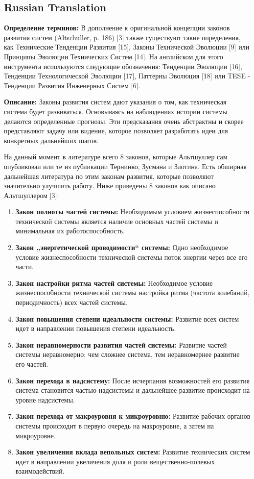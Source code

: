 \documentclass[11pt,a4paper]{article}
\begin{document}
\subsection*{Russian Translation}

\textbf{Определение терминов:} В дополнение к оригинальной концепции законов
развития систем (Altschuller, p. 186) [3] также существуют такие определения,
как Технические Тенденции Развития [15], Законы Технической Эволюции [9] или
Принципы Эволюции Технических Систем [14]. На английском для этого инструмента
используются следующие обозначения: Тенденции Эволюции [16], Тенденции
Технологической Эволюции [17], Паттерны Эволюция [18] или TESE - Тенденции
Развития Инженерных Систем [6].

\textbf{Описание:} Законы развития систем дают указания о том, как техническая
система будет развиваться. Основываясь на наблюдениях истории системы делаются
определенные прогнозы. Эти предсказания очень абстрактны и скорее представляют
задачу или видение, которое позволяет разработать идеи для конкретных
дальнейших шагов.

На данный момент в литературе всего 8 законов, которые Альтшуллер сам
опубликовал или те из публикации Тернинко, Зусмана и Злотина. Есть обширная
дальнейшая литература по этим законам развития, которые позволяют значительно
улучшить работу. Ниже приведены 8 законов как описано Альтшуллером [3]:
\begin{enumerate}
\item \textbf{Закон полноты частей системы:} Необходимым условием
  жизнеспособности технической системы является наличие основных частей
  системы и минимальная их работоспособность.
\item \textbf{Закон „энергетической проводимости“ системы:} Одно необходимое
  условие жизнеспособности технической системы поток энергии через все его
  части.
\item \textbf{Закон настройки ритма частей системы:} Необходимое условие
  жизнеспособности технической системы настройка ритма (частота колебаний,
  периодичность) всех частей системы.
\item \textbf{Закон повышения степени идеальности системы:} Развитие всех
  систем идет в направлении повышения степени идеальность.
\item \textbf{Закон неравномерности развития частей системы:} Развитие частей
  системы неравномерно; чем сложнее система, тем неравномернее развитие его
  частей.
\item \textbf{Закон перехода в надсистему:} После исчерпания возможностей его
  развития система становится частью надсистемы и дальнейшее развитие
  происходит на уровне надсистемы.
\item \textbf{Закон перехода от макроуровня к микроуровню:} Развитие рабочих
  органов системы происходит в первую очередь на макроуровне, а затем на
  микроуровне.
\item \textbf{Закон увеличения вклада вепольных систем:} Развитие технических
  систем идет в направлении увеличения доля и роли вещественно-полевых
  взаимодействий.
\end{enumerate}
\end{document}
